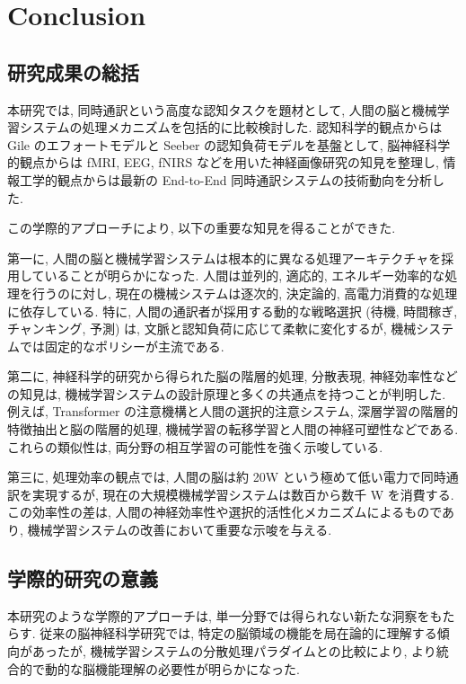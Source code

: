 \section{Conclusion}

\subsection{研究成果の総括}

本研究では, 同時通訳という高度な認知タスクを題材として, 人間の脳と機械学習システムの処理メカニズムを包括的に比較検討した.
認知科学的観点からは Gile のエフォートモデルと Seeber の認知負荷モデルを基盤として, 脳神経科学的観点からは fMRI, EEG, fNIRS などを用いた神経画像研究の知見を整理し, 情報工学的観点からは最新の End-to-End 同時通訳システムの技術動向を分析した.

この学際的アプローチにより, 以下の重要な知見を得ることができた.

第一に, 人間の脳と機械学習システムは根本的に異なる処理アーキテクチャを採用していることが明らかになった.
人間は並列的, 適応的, エネルギー効率的な処理を行うのに対し, 現在の機械システムは逐次的, 決定論的, 高電力消費的な処理に依存している.
特に, 人間の通訳者が採用する動的な戦略選択 (待機, 時間稼ぎ, チャンキング, 予測) は, 文脈と認知負荷に応じて柔軟に変化するが, 機械システムでは固定的なポリシーが主流である.

第二に, 神経科学的研究から得られた脳の階層的処理, 分散表現, 神経効率性などの知見は, 機械学習システムの設計原理と多くの共通点を持つことが判明した.
例えば, Transformer の注意機構と人間の選択的注意システム, 深層学習の階層的特徴抽出と脳の階層的処理, 機械学習の転移学習と人間の神経可塑性などである.
これらの類似性は, 両分野の相互学習の可能性を強く示唆している.

第三に, 処理効率の観点では, 人間の脳は約 20W という極めて低い電力で同時通訳を実現するが, 現在の大規模機械学習システムは数百から数千 W を消費する.
この効率性の差は, 人間の神経効率性や選択的活性化メカニズムによるものであり, 機械学習システムの改善において重要な示唆を与える.

\subsection{学際的研究の意義}

本研究のような学際的アプローチは, 単一分野では得られない新たな洞察をもたらす.
従来の脳神経科学研究では, 特定の脳領域の機能を局在論的に理解する傾向があったが, 機械学習システムの分散処理パラダイムとの比較により, より統合的で動的な脳機能理解の必要性が明らかになった.

